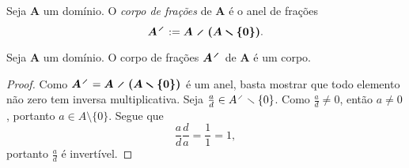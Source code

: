 \begin{definition}
Seja $\bm A$ um domínio. O \emph{corpo de frações} de $\bm A$ é o anel de frações
	\begin{equation*}
	\bm{A^{\olddiv}} := \bm{A \olddiv (A \setminus \{0\})}.
	\end{equation*}
\end{definition}

\begin{proposition}
Seja $\bm A$ um domínio. O corpo de frações $\bm{A^{\olddiv}}$ de $\bm A$ é um corpo.
\end{proposition}
\begin{proof}
Como $\bm{A^{\olddiv}} = \bm{A \olddiv (A \setminus \{0\})}$ é um anel, basta mostrar que todo elemento não zero tem inversa multiplicativa. Seja $\frac{a}{d} \in A^{\olddiv} \setminus \{0\}$. Como $\frac{a}{d} \neq 0$, então $a \neq 0$, portanto $a \in A \setminus \{0\}$. Segue que
	\begin{equation*}
	\frac{a}{d}\frac{d}{a} = \frac{1}{1} = 1,
	\end{equation*}
portanto $\frac{a}{d}$ é invertível.
\end{proof}

